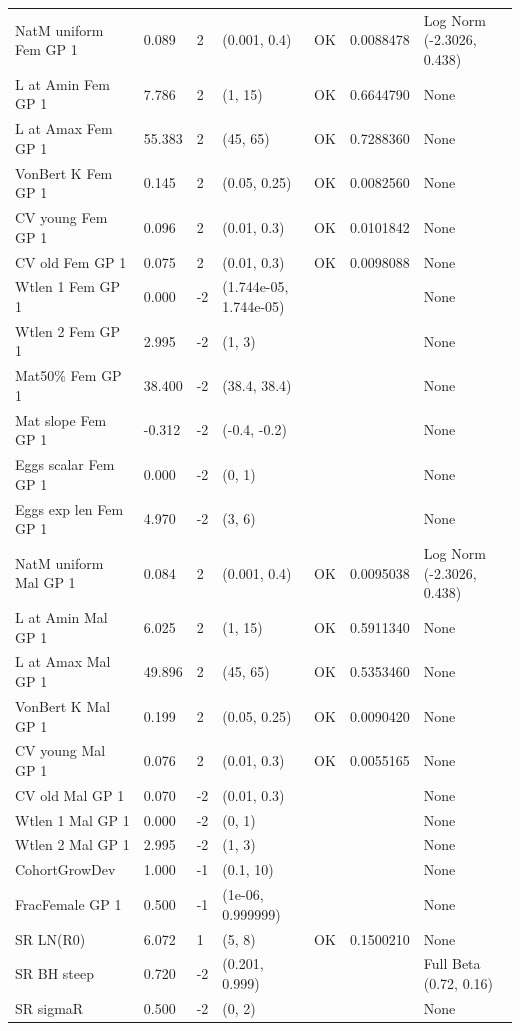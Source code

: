 \documentclass[11pt,
  english,
  a4paper,
]{article}
\begin{document}
\begin{landscape}
\begin{longtable}[t]{>{\raggedright\arraybackslash}p{8.5cm}lllll>{\raggedright\arraybackslash}p{4cm}}
\endfoot
\bottomrule
\endlastfoot
NatM uniform Fem GP 1 & 0.089 & 2 & (0.001, 0.4) & OK & 0.0088478 & Log Norm (-2.3026, 0.438)\\
L at Amin Fem GP 1 & 7.786 & 2 & (1, 15) & OK & 0.6644790 & None\\
L at Amax Fem GP 1 & 55.383 & 2 & (45, 65) & OK & 0.7288360 & None\\
VonBert K Fem GP 1 & 0.145 & 2 & (0.05, 0.25) & OK & 0.0082560 & None\\
CV young Fem GP 1 & 0.096 & 2 & (0.01, 0.3) & OK & 0.0101842 & None\\
CV old Fem GP 1 & 0.075 & 2 & (0.01, 0.3) & OK & 0.0098088 & None\\
Wtlen 1 Fem GP 1 & 0.000 & -2 & (1.744e-05, 1.744e-05) &  &  & None\\
Wtlen 2 Fem GP 1 & 2.995 & -2 & (1, 3) &  &  & None\\
Mat50\% Fem GP 1 & 38.400 & -2 & (38.4, 38.4) &  &  & None\\
Mat slope Fem GP 1 & -0.312 & -2 & (-0.4, -0.2) &  &  & None\\
Eggs scalar Fem GP 1 & 0.000 & -2 & (0, 1) &  &  & None\\
Eggs exp len Fem GP 1 & 4.970 & -2 & (3, 6) &  &  & None\\
NatM uniform Mal GP 1 & 0.084 & 2 & (0.001, 0.4) & OK & 0.0095038 & Log Norm (-2.3026, 0.438)\\
L at Amin Mal GP 1 & 6.025 & 2 & (1, 15) & OK & 0.5911340 & None\\
L at Amax Mal GP 1 & 49.896 & 2 & (45, 65) & OK & 0.5353460 & None\\
VonBert K Mal GP 1 & 0.199 & 2 & (0.05, 0.25) & OK & 0.0090420 & None\\
CV young Mal GP 1 & 0.076 & 2 & (0.01, 0.3) & OK & 0.0055165 & None\\
CV old Mal GP 1 & 0.070 & -2 & (0.01, 0.3) &  &  & None\\
Wtlen 1 Mal GP 1 & 0.000 & -2 & (0, 1) &  &  & None\\
Wtlen 2 Mal GP 1 & 2.995 & -2 & (1, 3) &  &  & None\\
CohortGrowDev & 1.000 & -1 & (0.1, 10) &  &  & None\\
FracFemale GP 1 & 0.500 & -1 & (1e-06, 0.999999) &  &  & None\\
SR LN(R0) & 6.072 & 1 & (5, 8) & OK & 0.1500210 & None\\
SR BH steep & 0.720 & -2 & (0.201, 0.999) &  &  & Full Beta (0.72, 0.16)\\
SR sigmaR & 0.500 & -2 & (0, 2) &  &  & None\\

\end{longtable}
\end{landscape}
\end{document}
